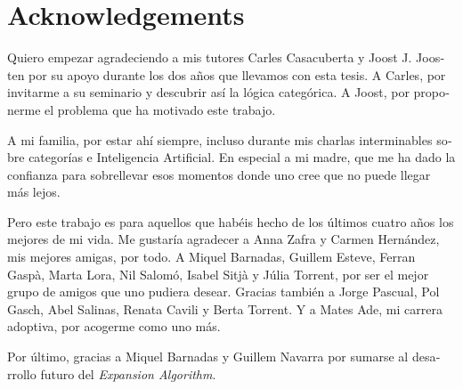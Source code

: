 \pagestyle{fancy}
\newpage \thispagestyle{empty}

\section*{Acknowledgements}

\begin{otherlanguage}{spanish}

Quiero empezar agradeciendo a mis tutores Carles Casacuberta y Joost J. Joosten
por su apoyo durante los dos a\~nos que llevamos con esta tesis. A Carles, por invitarme
a su seminario y descubrir as\'i la l\'ogica categ\'orica. A Joost, por
proponerme el problema que ha motivado este trabajo.

A mi familia, por estar ah\'i siempre, incluso durante mis charlas interminables sobre categor\'ias 
e Inteligencia Artificial. En especial a mi madre, que me ha dado la confianza para sobrellevar esos momentos 
donde uno cree que no puede llegar m\'as lejos.

Pero este trabajo es para aquellos que hab\'eis hecho de los \'ultimos cuatro a\~nos los mejores de mi vida.
Me gustar\'ia agradecer a Anna Zafra y Carmen Hern\'andez, mis mejores amigas, por todo. 
A Miquel Barnadas, Guillem Esteve, Ferran Gasp\`a, Marta Lora, Nil
Salom\'o, Isabel Sitj\`a y J\'ulia Torrent, por ser el mejor grupo de amigos que uno
pudiera desear. Gracias tambi\'en a Jorge Pascual, Pol Gasch, Abel Salinas, Renata Cavili y Berta Torrent.
Y a Mates Ade, mi carrera adoptiva, por acogerme como uno m\'as.

Por \'ultimo, gracias a Miquel Barnadas y Guillem Navarra por sumarse al
desarrollo futuro del \textit{Expansion Algorithm}.

\end{otherlanguage}
